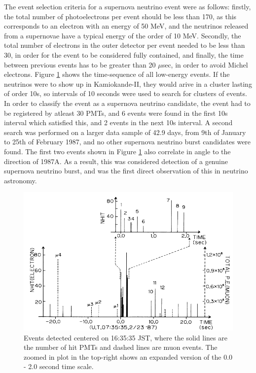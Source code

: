 The event selection criteria for a supernova neutrino event were as follows: firstly, the total number of photoelectrons per event should be less than 170, as this corresponds to an electron with an energy of 50 MeV, and the neutrinos released from a supernovae have a typical energy of the order of 10 MeV. Secondly, the total number of electrons in the outer detector per event needed to be less than 30, in order for the event to be considered fully contained, and finally, the time between previous events has to be greater than 20 $\mu$sec, in order to avoid Michel electrons. Figure \ref{fig:1987A_events} shows the time-sequence of all low-energy events. If the neutrinos were to show up in Kamiokande-II, they would arive in a cluster lasting of order 10s, so intervals of 10 seconds were used to search for clusters of events. In order to classify the event as a supernova neutrino candidate, the event had to be registered by atleast 30 PMTs, and 6 events were found in the first 10s interval which satisfied this, and 2 events in the next 10s interval. A second search was performed on a larger data sample of 42.9 days, from 9th of January to 25th of February 1987, and no other supernova neutrino burst candidates were found. The first two events shown in Figure \ref{fig:1987A_events} also correlate in angle to the direction of 1987A. As a result, this was considered detection of a genuine supernova neutrino burst, and was the first direct observation of this in neutrino astronomy. 

\begin{figure}
    \includegraphics[width=\textwidth]{Figures/1987A_events.png}
    \caption{Events detected centered on 16:35:35 JST,  where the solid lines are the number of hit PMTs and dashed lines are muon events. The zoomed in plot in the top-right shows an expanded version of the 0.0 - 2.0 second time scale.  }
    \label{fig:1987A_events}
\end{figure}

